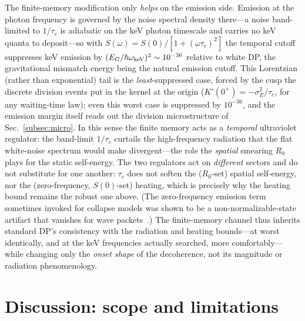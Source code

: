 \documentclass[aps,prd,onecolumn,amsmath,amssymb,nofootinbib,superscriptaddress]{revtex4-2}
\begin{document}
The finite-memory modification only \emph{helps} on the emission side. Emission at the photon frequency
is governed by the noise spectral density there---a noise band-limited to $1/\tau_c$ is adiabatic on the
keV photon timescale and carries no keV quanta to deposit---so with $S(\omega)=S(0)/[1+(\omega\tau_c)^2]$
the temporal cutoff suppresses keV emission by $(E_G/\hbar\omega_{\rm keV})^2\sim10^{-36}$ relative to
white DP, the gravitational mismatch energy being the natural emission cutoff. This Lorentzian (rather
than exponential) tail is the \emph{least}-suppressed case, forced by the cusp the discrete division
events put in the kernel at the origin ($K'(0^+)=-\sigma_E^2/\tau_c$, for any waiting-time law); even
this worst case is suppressed by $10^{-36}$, and the emission margin itself reads out the division
microstructure of Sec.~\ref{subsec:micro}. In this sense the finite memory acts as a \emph{temporal}
ultraviolet regulator: the band-limit $1/\tau_c$ curtails the high-frequency radiation that the flat
white-noise spectrum would make divergent---the role the \emph{spatial} smearing $R_0$ plays for the
static self-energy. The two regulators act on \emph{different} sectors and do not substitute for one
another: $\tau_c$ does not soften the ($R_0$-set) spatial self-energy, nor the (zero-frequency,
$S(0)$-set) heating, which is precisely why the heating bound remains the robust one above. (The
zero-frequency emission term
sometimes invoked for collapse models was shown to be a non-normalizable-state artifact that vanishes
for wave packets~\cite{R9,R10}.) The finite-memory channel thus inherits standard DP's consistency with
the radiation and heating bounds---at worst identically, and at the keV frequencies actually searched,
more comfortably---while changing only the \emph{onset shape} of the decoherence, not its magnitude or
radiation phenomenology.

\section{Discussion: scope and limitations}\label{sec:limits}
\end{document}
